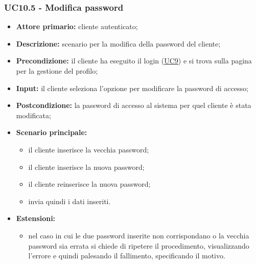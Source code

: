 \subsubsection{UC10.5 - Modifica password}
\label{UC10.5}
\begin{itemize}
    \item \textbf{Attore primario:} cliente autenticato;
    \item \textbf{Descrizione:} scenario per la modifica della password del cliente;
    \item \textbf{Precondizione:} il cliente ha eseguito il login (\hyperref[UC9]{UC9}) e si trova sulla pagina per la gestione del profilo;
    \item \textbf{Input:} il cliente seleziona l'opzione per modificare la password di accesso;
    \item \textbf{Postcondizione:} la password di accesso al sistema per quel cliente è stata modificata;
    \item \textbf{Scenario principale:}
    \begin{itemize}
        \item il cliente inserisce la vecchia password;
        \item il cliente inserisce la nuova password;
        \item il cliente reinserisce la nuova password;
        \item invia quindi i dati inseriti.
    \end{itemize}
    \item \textbf{Estensioni:}
    \begin{itemize}
        \item nel caso in cui le due password inserite non corrispondano o la vecchia password sia errata
        si chiede di ripetere il procedimento, visualizzando l'errore e quindi palesando il fallimento, specificando il motivo.
    \end{itemize}
\end{itemize}

